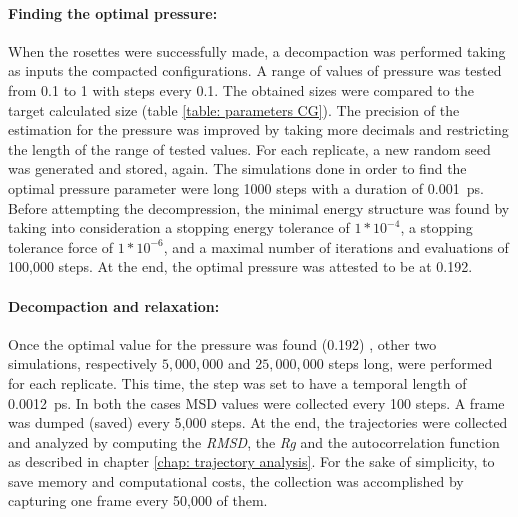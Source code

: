 \paragraph{Finding the optimal pressure:} \label{parag: optimal pressure}

When the rosettes were successfully made, a decompaction was performed taking as inputs the compacted configurations. A range of values of pressure was tested from 0.1 to 1 with steps every 0.1. The obtained sizes were compared to the target calculated size (table \ref{table: parameters CG}). The precision of the estimation for the pressure was improved by taking more decimals and restricting the length of the range of tested values. For each replicate, a new random seed was generated and stored, again. The simulations done in order to find the optimal pressure parameter were long 1000 steps with a duration of \SI{0.001}{\pico\second}.
Before attempting the decompression, the minimal energy structure was found by taking into consideration a stopping energy tolerance of $1*10^{-4}$, a stopping tolerance force of $1*10^{-6}$, and a maximal number of iterations and evaluations of 100,000 steps. %
At the end, the optimal pressure was attested to be at 0.192. %





\paragraph{Decompaction and relaxation:}

Once the optimal value for the pressure was found (0.192) %
, other two simulations, respectively $5,000,000$ and $25,000,000$ steps long, were performed for each replicate. This time, the step was set to have a temporal length of \SI{0.0012}{\pico\second}. In both the cases MSD values were collected every 100 steps. A frame was dumped (saved) every 5,000 steps. At the end, the trajectories were collected and analyzed by computing the \textit{RMSD}, the \textit{Rg} and the autocorrelation function as described in chapter \ref{chap: trajectory analysis}. For the sake of simplicity, to save memory and computational costs, the collection was accomplished by capturing one frame every 50,000 of them.


